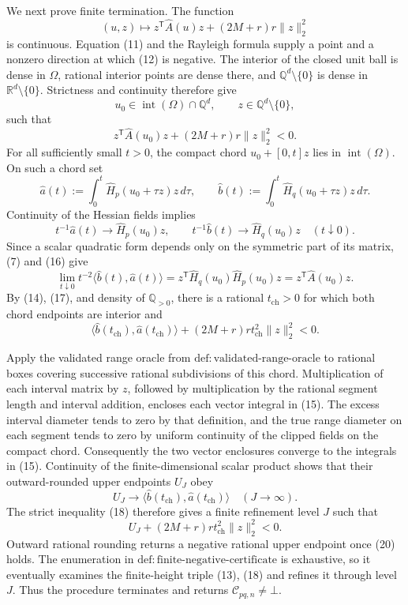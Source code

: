We next prove finite termination.  The function
\[
 (u,z)\longmapsto
 z^{\mathsf T}\widehat A(u)z+(2M+r)r\lVert z\rVert_2^2
 \tag{12}
\]
is continuous.  Equation (11) and the Rayleigh formula supply a point and a nonzero direction at which (12) is negative.  The interior of the closed unit ball is dense in \(\Omega\), rational interior points are dense there, and \(\mathbb Q^d\setminus\{0\}\) is dense in \(\mathbb R^d\setminus\{0\}\).  Strictness and continuity therefore give
\[
 u_0\in\operatorname{int}(\Omega)\cap\mathbb Q^d,
 \qquad z\in\mathbb Q^d\setminus\{0\},
 \tag{13}
\]
such that
\[
 z^{\mathsf T}\widehat A(u_0)z
 +(2M+r)r\lVert z\rVert_2^2<0.
 \tag{14}
\]
For all sufficiently small \(t>0\), the compact chord \(u_0+[0,t]z\) lies in \(\operatorname{int}(\Omega)\).  On such a chord set
\[
 \widehat a(t):=\int_0^t\widehat H_p(u_0+\tau z)z\,d\tau,
 \qquad
 \widehat b(t):=\int_0^t\widehat H_q(u_0+\tau z)z\,d\tau.
 \tag{15}
\]
Continuity of the Hessian fields implies
\[
 t^{-1}\widehat a(t)\longrightarrow\widehat H_p(u_0)z,
 \qquad
 t^{-1}\widehat b(t)\longrightarrow\widehat H_q(u_0)z
 \quad(t\downarrow0).
 \tag{16}
\]
Since a scalar quadratic form depends only on the symmetric part of its matrix, (7) and (16) give
\[
 \lim_{t\downarrow0}t^{-2}
 \langle\widehat b(t),\widehat a(t)\rangle
 =z^{\mathsf T}\widehat H_q(u_0)\widehat H_p(u_0)z
 =z^{\mathsf T}\widehat A(u_0)z.
 \tag{17}
\]
By (14), (17), and density of \(\mathbb Q_{>0}\), there is a rational \(t_{\mathrm{ch}}>0\) for which both chord endpoints are interior and
\[
 \langle\widehat b(t_{\mathrm{ch}}),
          \widehat a(t_{\mathrm{ch}})\rangle
 +(2M+r)r t_{\mathrm{ch}}^2\lVert z\rVert_2^2<0.
 \tag{18}
\]

Apply the validated range oracle from \(\mathrm{def:validated\text{-}range\text{-}oracle}\) to rational boxes covering successive rational subdivisions of this chord.  Multiplication of each interval matrix by \(z\), followed by multiplication by the rational segment length and interval addition, encloses each vector integral in (15).  The excess interval diameter tends to zero by that definition, and the true range diameter on each segment tends to zero by uniform continuity of the clipped fields on the compact chord.  Consequently the two vector enclosures converge to the integrals in (15).  Continuity of the finite-dimensional scalar product shows that their outward-rounded upper endpoints \(U_J\) obey
\[
 U_J\longrightarrow
 \langle\widehat b(t_{\mathrm{ch}}),
          \widehat a(t_{\mathrm{ch}})\rangle
 \quad(J\to\infty).
 \tag{19}
\]
The strict inequality (18) therefore gives a finite refinement level \(J\) such that
\[
 U_J+(2M+r)r t_{\mathrm{ch}}^2\lVert z\rVert_2^2<0.
 \tag{20}
\]
Outward rational rounding returns a negative rational upper endpoint once (20) holds.  The enumeration in \(\mathrm{def:finite\text{-}negative\text{-}certificate}\) is exhaustive, so it eventually examines the finite-height triple (13), (18) and refines it through level \(J\).  Thus the procedure terminates and returns \(\mathcal C_{pq,n}\ne\bot\).


